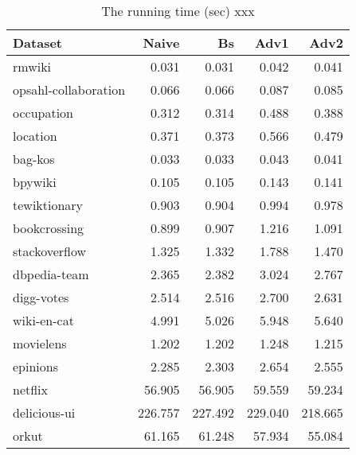 \begin{table}
    \centering
\caption{The running time (sec) xxx}
\label{tab:dataset_results}
\begin{tabular}{l| rrrr}
\toprule
Dataset & Naive & Bs & Adv1 & Adv2 \\
\midrule
rmwiki & 0.031 & 0.031 & 0.042 & 0.041 \\
opsahl-collaboration & 0.066 & 0.066 & 0.087 & 0.085 \\
occupation & 0.312 & 0.314 & 0.488 & 0.388 \\
location & 0.371 & 0.373 & 0.566 & 0.479 \\
bag-kos & 0.033 & 0.033 & 0.043 & 0.041 \\
bpywiki & 0.105 & 0.105 & 0.143 & 0.141 \\
tewiktionary & 0.903 & 0.904 & 0.994 & 0.978 \\
bookcrossing & 0.899 & 0.907 & 1.216 & 1.091 \\
stackoverflow & 1.325 & 1.332 & 1.788 & 1.470 \\
dbpedia-team & 2.365 & 2.382 & 3.024 & 2.767 \\
digg-votes & 2.514 & 2.516 & 2.700 & 2.631 \\
wiki-en-cat & 4.991 & 5.026 & 5.948 & 5.640 \\
movielens & 1.202 & 1.202 & 1.248 & 1.215 \\
epinions & 2.285 & 2.303 & 2.654 & 2.555 \\
netflix & 56.905 & 56.905 & 59.559 & 59.234 \\
delicious-ui & 226.757 & 227.492 & 229.040 & 218.665 \\
orkut & 61.165 & 61.248 & 57.934 & 55.084 \\
\bottomrule
\end{tabular}
\end{table}